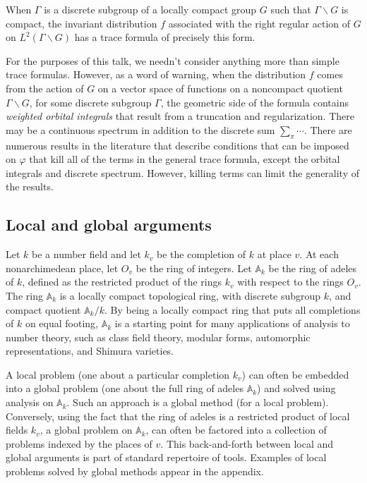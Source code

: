 \documentclass[brochure,english,12pt]{bourbaki}
\newcommand{\ring}[1]{\mathbb{#1}}
\def\A{\ring{A}}
\begin{document}
When $\Gamma$ is a discrete subgroup of a locally compact group $G$
such that $\Gamma\backslash G$ is compact, the invariant distribution
$f$ associated with the right regular action of $G$ on
$L^2(\Gamma\backslash G)$ has a trace formula of precisely this form.

For the purposes of this talk, we needn't consider anything more than
simple trace formulas.  However, as a word of warning, when the
distribution $f$ comes from the action of $G$ on a vector space of
functions on a noncompact quotient $\Gamma\backslash G$, for some
discrete subgroup $\Gamma$, the geometric side of the formula contains
{\it weighted orbital integrals} that result from a truncation and
regularization.  There may be a continuous spectrum in addition to the
discrete sum $\sum_\pi \cdots$.  There are numerous results in the
literature that describe conditions that can be imposed on $\varphi$
that kill all of the terms in the general trace formula, except the
orbital integrals and discrete spectrum.  However, killing terms can
limit the generality of the results.


\subsection{Local and global arguments}

Let $k$ be a number field and let $k_v$ be the completion of $k$ at
place $v$.  At each nonarchimedean place, let $O_v$ be the ring of
integers.  Let $\A_k$ be the ring of adeles of $k$, defined as the
restricted product of the rings $k_v$ with respect to the rings $O_v$.
The ring $\A_k$ is a locally compact topological ring, with discrete
subgroup $k$, and compact quotient $\A_k/k$.  By being a locally compact
ring that puts all completions of $k$ on equal footing,   $\A_k$
is a starting point for many applications of analysis to number theory, such
as class field theory, modular forms, automorphic representations, and Shimura varieties.

A local problem (one about a particular completion $k_v$) can often be
embedded into a global problem (one about the full ring of adeles $\A_k$) and solved
using analysis on $\A_k$.  Such an approach is a global method (for a local problem).
Conversely, using the fact that the ring of adeles is a restricted product of local fields $k_v$,
a global problem on $\A_k$, can often be factored into a collection of problems indexed by 
the places of $v$.
This back-and-forth between local and global arguments is part of standard repertoire
of tools.  Examples of local problems solved by global methods appear in the appendix.
\end{document}
